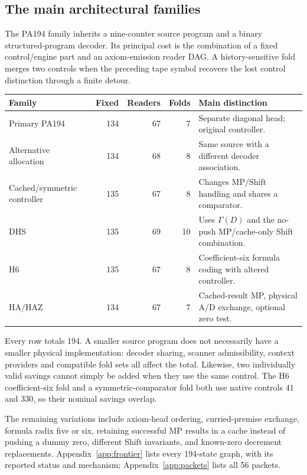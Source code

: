 \documentclass[11pt,letterpaper]{article}
\begin{document}
\subsection{The main architectural families}

The PA194 family inherits a nine-counter source program and a binary
structured-program decoder. Its principal cost is the combination of a fixed
control/engine part and an axiom-emission reader DAG. A history-sensitive
fold merges two controls when the preceding tape symbol recovers the lost
control distinction through a finite detour.

\begin{center}\small
\begin{tabularx}{\linewidth}{@{}lrrrX@{}}
\toprule
Family & Fixed & Readers & Folds & Main distinction\\
\midrule
Primary PA194 &134&67&7&Separate diagonal head; original controller.\\
Alternative allocation &134&68&8&Same source with a different decoder association.\\
Cached/symmetric controller &135&67&8&Changes MP/Shift handling and shares a comparator.\\
DHS &135&69&10&Uses $\Gamma(D)$ and the no-push MP/cache-only Shift combination.\\
H6 &135&67&8&Coefficient-six formula coding with altered controller.\\
HA/HAZ &134&67&7&Cached-result MP, physical A/D exchange, optional zero test.\\
\bottomrule
\end{tabularx}\end{center}

Every row totals 194. A smaller source program does not necessarily have a
smaller physical implementation: decoder sharing, scanner admissibility,
context providers and compatible fold sets all affect the total. Likewise,
two individually valid savings cannot simply be added when they use the
same control. The H6 coefficient-six fold and a symmetric-comparator fold
both use native controls 41 and 330, so their nominal savings overlap.

The remaining variations include axiom-head ordering, curried-premise
exchange, formula radix five or six, retaining successful MP results in a
cache instead of pushing a dummy zero, different Shift invariants, and
known-zero decrement replacements. Appendix~\ref{app:frontier} lists every
194-state graph, with its reported status and mechanism; Appendix~\ref{app:packets}
lists all 56 packets.
\end{document}
